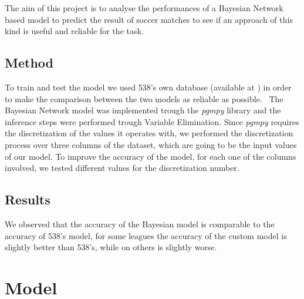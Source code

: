 \documentclass[letterpaper]{article}
\begin{document}
The aim of this project is to analyse the performances of a Bayesian Network based model to predict the result of soccer matches to see if an approach of this kind is useful and reliable for the task.


\subsection{Method}

To train and test the model we used 538's own database (available at \cite{538DB}) in order to make the comparison between the two models as reliable as possible. \ The Bayesian Network model was implemented trough the \textit{pgmpy} library and the inference steps were performed trough Variable Elimination. Since \textit{pgmpy} requires the discretization of the values it operates with, we performed the discretization process over three columns of the dataset, which are going to be the input values of our model. To improve the accuracy of the model, for each one of the columns involved, we tested different values for the discretization number.


\subsection{Results}



We observed that the accuracy of the Bayesian model is comparable to the accuracy of 538's model, for some leagues the accuracy of the custom model is slightly better than 538's, while on others is slightly worse.



\section{Model}
\end{document}
